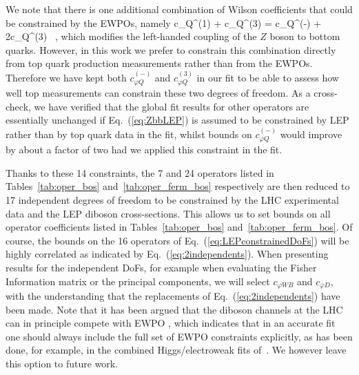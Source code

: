 { 
  We note that there is one additional combination of Wilson coefficients that
  could be constrained by the EWPOs, namely
  \be
  \label{eq:ZbbLEP}
  c_{\varphi Q}^{(1)} +  c_{\varphi Q}^{(3)} =  c_{\varphi Q}^{(-)}
  + 2c_{\varphi Q}^{(3)} \, ,
  \ee
  which modifies the left-handed coupling of the $Z$ boson
  to bottom quarks.
  However, in this work we prefer to constrain this
  combination directly from top quark production
  measurements rather than from the EWPOs.
  Therefore we have kept both $c_{\varphi Q}^{(-)}$
   and $c_{\varphi Q}^{(3)}$ in our fit to be able to assess 
   how well top measurements can constrain these two degrees of freedom. 
 As a cross-check,
  we have verified that the global fit results for other operators are essentially
  unchanged if Eq.~(\ref{eq:ZbbLEP}) is assumed to be constrained
  by LEP rather than by top quark data in the fit, whilst bounds on $c_{\varphi Q}^{(-)}$
  would improve by about a factor of two had we applied this constraint in the fit. 
}

Thanks to these 14 constraints, the 7 and
24 operators listed in Tables~\ref{tab:oper_bos} and~\ref{tab:oper_ferm_bos} respectively
are then reduced to 17 independent degrees of freedom to be constrained by the
LHC experimental data and the LEP diboson cross-sections.
%
This allows us to set bounds on all operator coefficients
listed in Tables~\ref{tab:oper_bos} and~\ref{tab:oper_ferm_bos}.
%
Of course, the bounds on the 16
operators of Eq.~(\ref{eq:LEPconstrainedDoFs})
will be highly correlated as indicated by Eq.~(\ref{eq:2independents}).
%
When presenting results for the independent DoFs, for example when evaluating
the Fisher Information matrix or the principal components, we will select
$c_{\varphi W B}$ and $c_{\varphi D}$, with the understanding that the
replacements of Eq.~(\ref{eq:2independents}) have been made.
%
Note that it has been argued that the diboson channels at the LHC can in
principle compete with EWPO \cite{Zhang:2016zsp,Grojean:2018dqj}, which
indicates that in an accurate fit one should always include the full set of
EWPO constraints explicitly, as has been done, for example, in the combined
Higgs/electroweak fits of~\cite{Ellis:2018gqa,Ellis:2020unq}.
%
We  however leave this option to future work.

